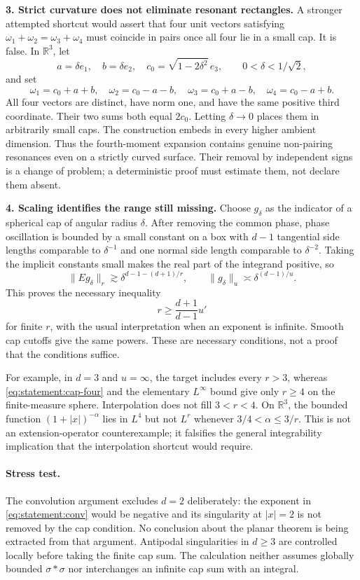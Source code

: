 \documentclass[11pt,a4paper]{article}
\newcommand{\R}{\mathbb{R}}
\numberwithin{equation}{section}
\begin{document}
\textbf{3. Strict curvature does not eliminate resonant rectangles.}
A stronger attempted shortcut would assert that four unit vectors satisfying
$\omega_1+\omega_2=\omega_3+\omega_4$ must coincide in pairs once all four
lie in a small cap. It is false. In $\R^3$, let
\[
 a=\delta e_1,\quad b=\delta e_2,\quad
 c_0=\sqrt{1-2\delta^2}\,e_3,\qquad 0<\delta<1/\sqrt2,
\]
and set
\[
 \omega_1=c_0+a+b,\quad \omega_2=c_0-a-b,\quad
 \omega_3=c_0+a-b,\quad \omega_4=c_0-a+b.
\]
All four vectors are distinct, have norm one, and have the same positive
third coordinate. Their two sums both equal $2c_0$. Letting $\delta\to0$
places them in arbitrarily small caps. The construction embeds in every
higher ambient dimension. Thus the fourth-moment expansion contains genuine
non-pairing resonances even on a strictly curved surface. Their removal by
independent signs is a change of problem; a deterministic proof must estimate
them, not declare them absent.

\textbf{4. Scaling identifies the range still missing.}
Choose $g_\delta$ as the indicator of a spherical cap of angular radius
$\delta$. After removing the common phase, phase oscillation is bounded by
a small constant on a box with $d-1$ tangential side lengths comparable to
$\delta^{-1}$ and one normal side length comparable to $\delta^{-2}$.
Taking the implicit constants small makes the real part of the integrand
positive, so
\[
 \|Eg_\delta\|_r\gtrsim
 \delta^{d-1-(d+1)/r},\qquad
 \|g_\delta\|_u\asymp\delta^{(d-1)/u}.
\]
This proves the necessary inequality
\begin{equation}\label{eq:statement:knapp}
 r\ge\frac{d+1}{d-1}u'
\end{equation}
for finite $r$, with the usual interpretation when an exponent is infinite.
Smooth cap cutoffs give the same powers. These are necessary conditions,
not a proof that the conditions suffice.

For example, in $d=3$ and $u=\infty$, the target includes every $r>3$,
whereas \eqref{eq:statement:cap-four} and the elementary $L^\infty$ bound give only
$r\ge4$ on the finite-measure sphere. Interpolation does not fill $3<r<4$.
On $\R^3$, the bounded function $(1+|x|)^{-\alpha}$ lies in $L^4$ but not
$L^r$ whenever $3/4<\alpha\le3/r$. This is not an extension-operator
counterexample; it falsifies the general integrability implication that the
interpolation shortcut would require.

\paragraph{Stress test.}
The convolution argument excludes $d=2$ deliberately: the exponent in
\eqref{eq:statement:conv} would be negative and its singularity at $|x|=2$ is not
removed by the cap condition. No conclusion about the planar theorem is
being extracted from that argument. Antipodal singularities in $d\ge3$
are controlled locally before taking the finite cap sum. The calculation
neither assumes globally bounded $\sigma*\sigma$ nor interchanges an
infinite cap sum with an integral.
\end{document}
